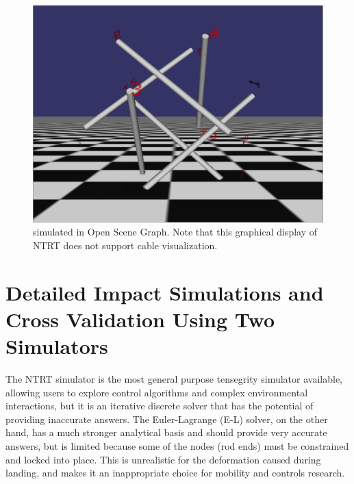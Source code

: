 \begin{figure}[th]
      \centering
      \includegraphics[width=0.8\columnwidth]{tex/img/OSG_sb}
      \caption{\SB{} simulated in Open Scene Graph. Note that this graphical display of NTRT does not support cable visualization.}
      \label{fig:OSG_SB}
\end{figure}

\section{Detailed Impact Simulations and Cross Validation Using Two Simulators}
The NTRT simulator is the most general purpose tensegrity simulator available, allowing users to explore control algorithms and complex environmental interactions, but it is an iterative discrete solver that has the potential of providing inaccurate answers.  The Euler-Lagrange (E-L) solver, on the other hand, has a much stronger analytical basis and should provide very accurate answers, but is limited because some of the nodes (rod ends) must be constrained and locked into place.  This is unrealistic for the deformation caused during landing, and makes it an inappropriate choice for mobility and controls research.

